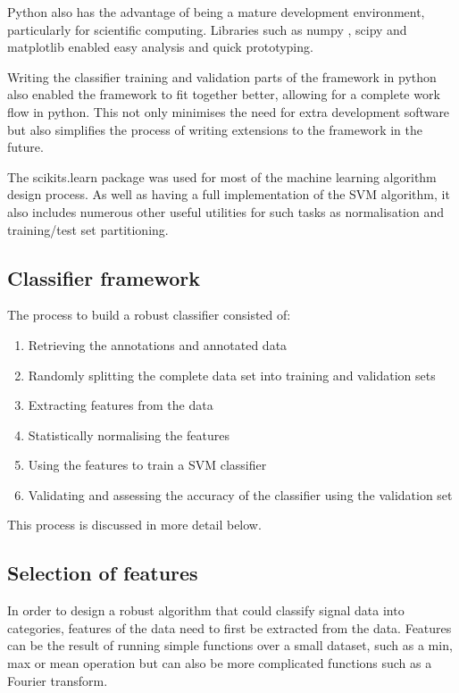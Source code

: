 Python also has the advantage of being a mature development environment, particularly for scientific computing. Libraries such as numpy \cite{numpy}, scipy \cite{scipy} and matplotlib \cite{matplotlib} enabled easy analysis and quick prototyping. 

Writing the classifier training and validation parts of the framework in python also enabled the framework to fit together better, allowing for a complete work flow in python. This not only minimises the need for extra development software but also simplifies the process of writing extensions to the framework in the future. 

The scikits.learn package was used for most of the machine learning algorithm design process. As well as having a full implementation of the SVM algorithm, it also includes numerous other useful utilities for such tasks as normalisation and training/test set partitioning. 

\subsection{Classifier framework}
\label{classifierframework}

The process to build a robust classifier consisted of:

\begin{enumerate}
\item Retrieving the annotations and annotated data

\item Randomly splitting the complete data set into training and validation sets

\item Extracting features from the data

\item Statistically normalising the features

\item Using the features to train a SVM classifier

\item Validating and assessing the accuracy of the classifier using the validation set
\end{enumerate}

This process is discussed in more detail below. 

\subsection{Selection of features}
In order to design a robust algorithm that could classify signal data into categories, features of the data need to first be extracted from the data. Features can be the result of running simple functions over a small dataset, such as a min, max or mean operation but can also be more complicated functions such as a Fourier transform. 

